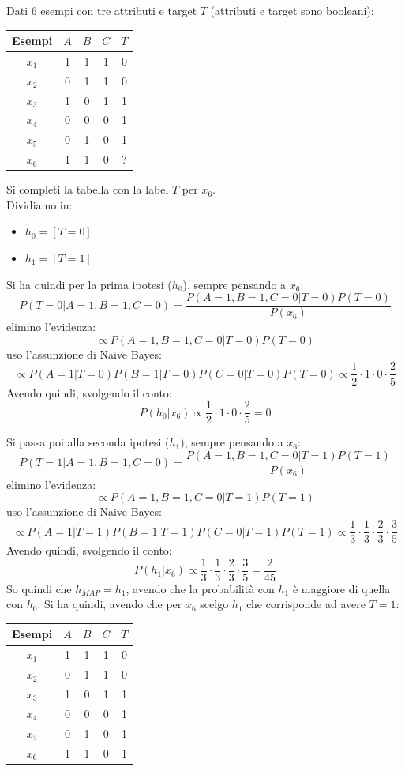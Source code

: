 \begin{esercizio}
  Dati 6 esempi con tre attributi e target $T$ (attributi e target sono
  booleani): 
  \begin{table}[H]
    \centering
    \begin{tabular}{c||c|c|c|c}
      Esempi & $A$ & $B$ & $C$ & $T$\\
      \hline
      \hline
      $x_1$ & 1 & 1 & 1 & 0\\
      $x_2$ & 0 & 1 & 1 & 0\\
      $x_3$ & 1 & 0 & 1 & 1\\
      $x_4$ & 0 & 0 & 0 & 1\\
      $x_5$ & 0 & 1 & 0 & 1\\
      $x_6$ & 1 & 1 & 0 & ?\\
    \end{tabular}
  \end{table}
  Si completi la tabella con la label $T$ per $x_6$.\\
  Dividiamo in:
  \begin{itemize}
    \item $h_0=[T=0]$
    \item $h_1=[T=1]$
  \end{itemize}
  Si ha quindi per la prima ipotesi ($h_0$), sempre pensando a $x_6$:
  \[P(T=0|A=1, B=1, C=0)=\frac{P(A=1, B=1, C=0|T=0)P(T=0)}{P(x_6)}\]
  elimino l'evidenza:
  \[\varpropto P(A=1, B=1, C=0|T=0)P(T=0)\]
  uso l'assunzione di Naive Bayes:
  \[\varpropto P(A=1|T=0)P(B=1|T=0)P(C=0|T=0)P(T=0)
    \varpropto \frac{1}{2}\cdot 1\cdot 0\cdot \frac{2}{5}\]
  Avendo quindi, svolgendo il conto:
  \[P(h_0|x_6)\varpropto  \frac{1}{2}\cdot 1\cdot  0\cdot\frac{2}{5}=0\]
  

  Si passa poi alla seconda ipotesi ($h_1$), sempre pensando a $x_6$:
  \[P(T=1|A=1, B=1, C=0)=\frac{P(A=1, B=1, C=0|T=1)P(T=1)}{P(x_6)}\]
  elimino l'evidenza:
  \[\varpropto P(A=1, B=1, C=0|T=1)P(T=1)\]
  uso l'assunzione di Naive Bayes:
  \[\varpropto P(A=1|T=1)P(B=1|T=1)P(C=0|T=1)P(T=1)
    \varpropto \frac{1}{3}\cdot \frac{1}{3}\cdot \frac{2}{3}\cdot\frac{3}{5}\]
  Avendo quindi, svolgendo il conto:
  \[P(h_1|x_6)\varpropto  \frac{1}{3}\cdot \frac{1}{3}\cdot
    \frac{2}{3}\cdot\frac{3}{5}=\frac{2}{45}\]
  So quindi che $h_{MAP}=h_1$, avendo che la probabilità con $h_1$ è maggiore di
  quella con $h_0$. Si ha quindi, avendo che per $x_6$ scelgo $h_1$ che
  corrisponde ad avere $T=1$:
  \begin{table}[H]
    \centering
    \begin{tabular}{c||c|c|c|c}
      Esempi & $A$ & $B$ & $C$ & $T$\\
      \hline
      \hline
      $x_1$ & 1 & 1 & 1 & 0\\
      $x_2$ & 0 & 1 & 1 & 0\\
      $x_3$ & 1 & 0 & 1 & 1\\
      $x_4$ & 0 & 0 & 0 & 1\\
      $x_5$ & 0 & 1 & 0 & 1\\
      $x_6$ & 1 & 1 & 0 & 1\\
    \end{tabular}
  \end{table}
  

\end{esercizio}
